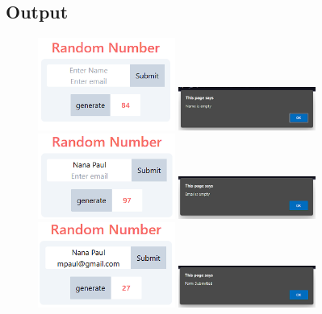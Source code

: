\documentclass{article}
\begin{document}
\subsection{Output}
\begin{figure}[h!]
	\centering
	\includegraphics[width=0.4\textwidth]{./Assets/p1501.png}
	\includegraphics[width=0.4\textwidth]{./Assets/p1502.png}
	\includegraphics[width=0.4\textwidth]{./Assets/p1503.png}
	\includegraphics[width=0.4\textwidth]{./Assets/p1504.png}
	\includegraphics[width=0.4\textwidth]{./Assets/p1505.png}
	\includegraphics[width=0.4\textwidth]{./Assets/p1506.png}
\end{figure}
\newpage
\end{document}
